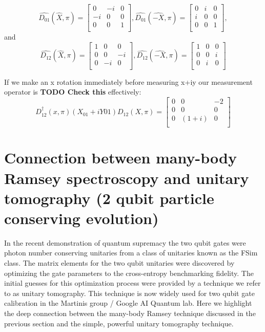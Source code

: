 {\begin{equation}
    \hat{D_{01}}(\hat{X}, \pi)=
    \begin{bmatrix}
        0  & -i & 0 \\
        -i & 0 & 0 \\
        0  & 0 & 1 \\
    \end{bmatrix},
    \hat{D_{01}}(\hat{-X}, \pi)=
    \begin{bmatrix}
        0  & i & 0 \\
        i & 0 & 0 \\
        0  & 0 & 1 \\
    \end{bmatrix},
\end{equation}
and
\begin{equation}
    \hat{D_{12}}(\hat{X}, \pi)=
    \begin{bmatrix}
        1 & 0 & 0 \\
        0 & 0 & -i \\
        0 & -i & 0 \\
    \end{bmatrix},
    \hat{D_{12}}(\hat{-X}, \pi)=
    \begin{bmatrix}
        1 & 0 & 0 \\
        0 & 0 & i \\
        0 & i & 0 \\
    \end{bmatrix}
\end{equation}

If we make an x rotation immediately before measuring x+iy our measurement operator is \textbf{TODO Check this} effectively:
\begin{equation}
    D_{12}^{\dagger}(x,\pi)(X_{01}+iY{01})D_{12}(X,\pi) =
    \begin{bmatrix}
        0 & 0 & -2 \\
        0 & 0 & 0 \\
        0 & (1+i) & 0 \\
    \end{bmatrix}
\end{equation}
} %

\section{ Connection between many-body Ramsey spectroscopy and unitary tomography (2 qubit particle conserving evolution)}
In the recent demonstration of quantum supremacy \cite{Arute2019} the two qubit gates were photon number conserving unitaries from a class of unitaries
known as the FSim class.
The matrix elements for the two qubit unitaries were discovered by optimizing the gate parameters to the cross-entropy benchmarking fidelity.
The initial guesses for this optimization process were provided by a technique we refer to as unitary tomography.
This technique is now widely used for two qubit gate calibration in the Martinis group / Google AI Quantum lab.
Here we highlight the deep connection between the many-body Ramsey technique discussed in the previous section and the simple, powerful unitary tomography technique.

